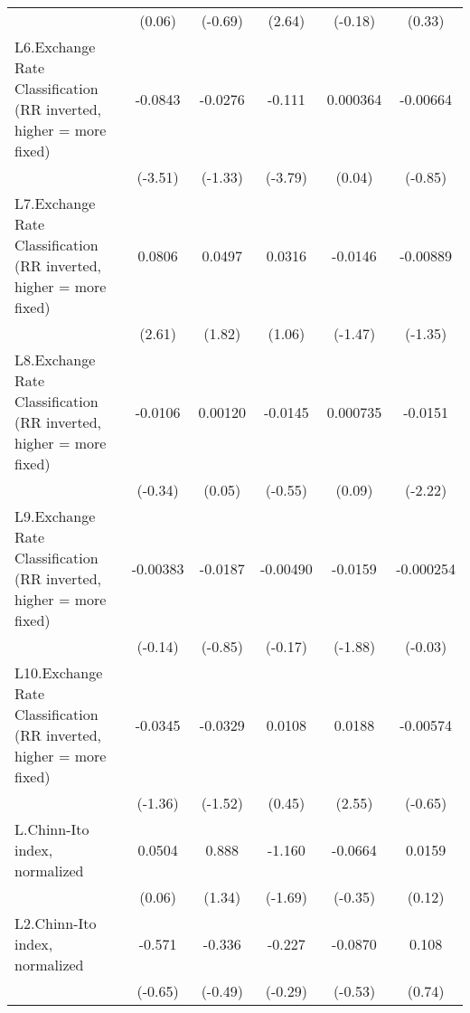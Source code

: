 {\begin{longtable}{l*{5}{c}}
                &   (0.06)         &  (-0.69)         &   (2.64)         &  (-0.18)         &   (0.33)         \\
[1em]
L6.Exchange Rate Classification (RR inverted, higher = more fixed)&  -0.0843\sym{***}&  -0.0276         &   -0.111\sym{***}& 0.000364         & -0.00664         \\
                &  (-3.51)         &  (-1.33)         &  (-3.79)         &   (0.04)         &  (-0.85)         \\
[1em]
L7.Exchange Rate Classification (RR inverted, higher = more fixed)&   0.0806\sym{*}  &   0.0497         &   0.0316         &  -0.0146         & -0.00889         \\
                &   (2.61)         &   (1.82)         &   (1.06)         &  (-1.47)         &  (-1.35)         \\
[1em]
L8.Exchange Rate Classification (RR inverted, higher = more fixed)&  -0.0106         &  0.00120         &  -0.0145         & 0.000735         &  -0.0151\sym{*}  \\
                &  (-0.34)         &   (0.05)         &  (-0.55)         &   (0.09)         &  (-2.22)         \\
[1em]
L9.Exchange Rate Classification (RR inverted, higher = more fixed)& -0.00383         &  -0.0187         & -0.00490         &  -0.0159         &-0.000254         \\
                &  (-0.14)         &  (-0.85)         &  (-0.17)         &  (-1.88)         &  (-0.03)         \\
[1em]
L10.Exchange Rate Classification (RR inverted, higher = more fixed)&  -0.0345         &  -0.0329         &   0.0108         &   0.0188\sym{*}  & -0.00574         \\
                &  (-1.36)         &  (-1.52)         &   (0.45)         &   (2.55)         &  (-0.65)         \\
[1em]
L.Chinn-Ito index, normalized&   0.0504         &    0.888         &   -1.160         &  -0.0664         &   0.0159         \\
                &   (0.06)         &   (1.34)         &  (-1.69)         &  (-0.35)         &   (0.12)         \\
[1em]
L2.Chinn-Ito index, normalized&   -0.571         &   -0.336         &   -0.227         &  -0.0870         &    0.108         \\
                &  (-0.65)         &  (-0.49)         &  (-0.29)         &  (-0.53)         &   (0.74)         \\

\end{longtable}}
